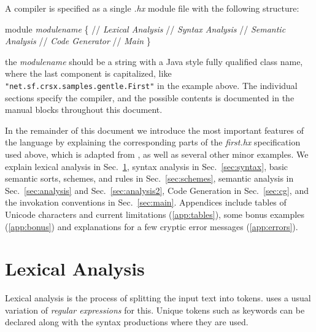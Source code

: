 \documentclass[11pt]{article} %
\begin{document}
\begin{manual}\label{man:structure}
  A \HAX compiler is specified as a single \emph{.hx} module file with the following structure:
\begin{code}[commandchars=\\\{\}]
module {\it\color{blue}modulename}
\{
  // {\it\color{blue}Lexical Analysis}
  // {\it\color{blue}Syntax Analysis}
  // {\it\color{blue}Semantic Analysis}
  // {\it\color{blue}Code Generator}
  // {\it\color{blue}Main}
\}
\end{code}
  the \emph{modulename} should be a string with a Java style fully qualified class name, where the
  last component is capitalized, like \verb|"net.sf.crsx.samples.gentle.First"| in the example
  above. The individual sections specify the compiler, and the possible contents is documented in
  the manual blocks throughout this document.
\end{manual}

\begin{plan}
  In the remainder of this document we introduce the most important features of the \HAX language by
  explaining the corresponding parts of the \emph{first.hx} specification used above, which is
  adapted from \cite[Fig. 1.7]{Aho+:2006}, as well as several other minor examples.  We explain
  lexical analysis in Sec.~\ref{sec:tokens}, syntax analysis in Sec.~\ref{sec:syntax}, basic
  semantic sorts, schemes, and rules in Sec.~\ref{sec:schemes}, semantic analysis in
  Sec.~\ref{sec:analysis} and Sec.~\ref{sec:analysis2}, Code Generation in Sec.~\ref{sec:cg}, and
  the invokation conventions in Sec.~\ref{sec:main}.  Appendices include tables of Unicode
  characters and current limitations (\ref{app:tables}), some bonus examples (\ref{app:bonus}) and
  explanations for a few cryptic error messages (\ref{app:errors}).
\end{plan}


\section{Lexical Analysis}
\label{sec:tokens}

Lexical analysis is the process of splitting the input text into tokens. \HAX uses a usual variation
of \emph{regular expressions} for this.  Unique tokens such as keywords can be declared along with
the syntax productions where they are used.
\end{document}
